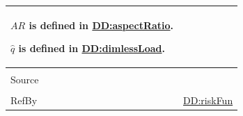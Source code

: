 \documentclass[12pt]{article}
\begin{document}
\begin{minipage}{\textwidth}
\begin{tabular}{>{\raggedright}p{}>{\raggedright\arraybackslash}p{}}
        $\mathit{AR}$ is defined in \hyperref[DD:aspectRatio]{DD:aspectRatio}.
        
        $\hat{q}$ is defined in \hyperref[DD:dimlessLoad]{DD:dimlessLoad}.
        
\\ \midrule \\
Source & \cite{astm2009}
         
\\ \midrule \\
RefBy & \hyperref[DD:riskFun]{DD:riskFun}
        
\\ \bottomrule
\end{tabular}
\end{minipage}

\vspace{\baselineskip}
\noindent
\end{document}
